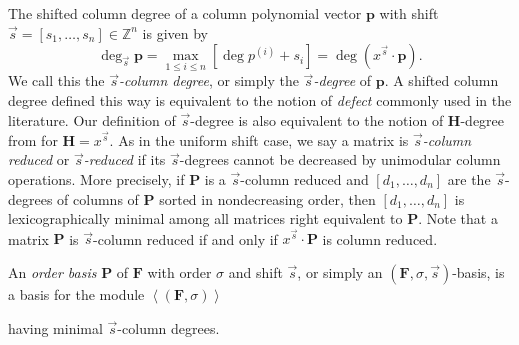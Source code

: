The shifted column degree of a column polynomial vector $\mathbf{p}$
with shift $\vec{s}=\left[s_{1},\dots,s_{n}\right]\in\mathbb{Z}^{n}$
is given by 
\[
\deg_{\vec{s}}\mathbf{p}=\max_{1\le i\le n}[\deg p^{\left(i\right)}+s_{i}]=\deg(x^{\vec{s}}\cdot\mathbf{p}).
\]
 We call this the \emph{$\vec{s}$-column degree}, or simply the \emph{$\vec{s}$-degree}
of $\mathbf{p}$. A shifted column degree defined this way is equivalent
to the notion of \emph{defect} commonly used in the literature. Our
definition of $\vec{s}$-degree is also equivalent to the notion of
$\mathbf{H}$-degree from \citep{BL1997} for $\mathbf{H}=x^{\vec{s}}$.
As in the uniform shift case, we say a matrix is \emph{$\vec{s}$-column
reduced} or \emph{$\vec{s}$-reduced} if its $\vec{s}$-degrees cannot
be decreased by unimodular column operations. More precisely, if $\mathbf{P}$
is a $\vec{s}$-column reduced and $[d_{1},\dots,d_{n}]$ are the
$\vec{s}$-degrees of columns of $\mathbf{P}$ sorted in nondecreasing
order, then $[d_{1},\dots,d_{n}]$ is lexicographically minimal among
all matrices right equivalent to $\mathbf{P}$. Note that a matrix
$\mathbf{P}$ is $\vec{s}$-column reduced if and only if $x^{\vec{s}}\cdot\mathbf{P}$
is column reduced\citep{BLV:1999,BLV:jsc06}. 

An \emph{order basis} \citep{BeLa94,BL1997} $\mathbf{P}$ of $\mathbf{F}$
with order $\sigma$ and shift $\vec{s}$, or simply an $\left(\mathbf{F},\sigma,\vec{s}\right)$-basis,
is a basis for the module $\left\langle \left(\mathbf{F},\sigma\right)\right\rangle $
\begin{comment}
\[
\left\langle \left(\mathbf{F},\vec{\sigma}\right)\right\rangle =\{\mathbf{p}\in\mathbb{K}\left[x\right]^{n\times1}\|\mathbf{F}\cdot\mathbf{p}=x^{\vec{\sigma}}\mathbf{r},\mathbf{r}\in\mathbb{K}[[x]]^{m\times1}\}
\]
\end{comment}
{} having minimal $\vec{s}$-column degrees.%
\begin{comment}
 If $\vec{\sigma}=\left[\sigma,\dots,\sigma\right]$ are constant
vectors then we simply write $\left(\mathbf{F},\sigma,\vec{s}\right)$-basis.
The precise definition of an $\left(\mathbf{F},\vec{\sigma},\vec{s}\right)$-basis
is as follows.
\end{comment}

